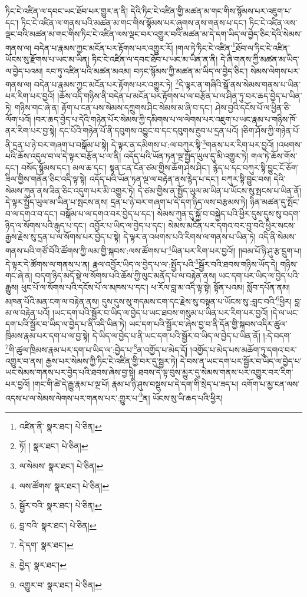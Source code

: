 ཏིང་ངེ་འཛིན་ལ་དབང་ཡང་ཐོབ་པར་གྱུར་ན་ནི། དེའི་ཏིང་ངེ་འཛིན་གྱི་མཚན་མ་གང་གིས་སྙོམས་པར་འཇུག་པ་དང་། ཏིང་ངེ་འཛིན་ལ་གནས་པའི་མཚན་མ་གང་གིས་སྙོམས་པར་ཞུགས་ནས་གནས་པ་དང་། ཏིང་ངེ་འཛིན་ལས་ལྡང་བའི་མཚན་མ་གང་གིས་ཏིང་ངེ་འཛིན་ལས་ལྡང་བར་འགྱུར་བའི་མཚན་མ་དེ་དག་ཡིད་ལ་བྱེད་ཅིང་དེའི་སེམས་གནས་ལ། བདེན་པ་རྣམས་ཀྱང་མངོན་པར་རྟོགས་པར་འགྱུར་རོ། །གལ་ཏེ་ཏིང་ངེ་འཛིན་\footnote{འཛིན་ནི་  སྣར་ཐང་།  པེ་ཅིན། }ཐོབ་ལ་ཏིང་ངེ་འཛིན་ཡོངས་སུ་རྫོགས་པ་ཡང་མ་ཡིན། ཏིང་ངེ་འཛིན་ལ་དབང་ཐོབ་པ་ཡང་མ་ཡིན་ན་ནི། དེ་ཞི་གནས་ཀྱི་མཚན་མ་ཡིད་ལ་བྱེད་པའམ། རབ་ཏུ་འཛིན་པའི་མཚན་མའམ། བཏང་སྙོམས་ཀྱི་མཚན་མ་ཡིད་ལ་བྱེད་ཅིང་། སེམས་ལེགས་པར་གནས་ལ། བདེན་པ་རྣམས་ཀྱང་མངོན་པར་རྟོགས་པར་འགྱུར་ཏེ། \footnote{ཏོ། །   སྣར་ཐང་།  པེ་ཅིན། }དེ་ལྟར་ན་གཞིའི་སྒོ་ནས་སེམས་གནས་པ་ཡིན་པར་རིག་པར་བྱའོ། །ཆོས་འདི་གཉིས་ནི་བདེན་པ་མངོན་པར་རྟོགས་པ་ལ་བརྩོན་པ་ལ་ཤིན་ཏུ་བར་ཆད་བྱེད་པ་ཡིན་ཏེ། གཉིས་གང་ཞེ་ན། རྟོག་པ་ངན་པས་སེམས་དཀྲུགས་ཤིང་སེམས་མ་ཞི་བ་དང་། ཤེས་བྱའི་དངོས་པོ་ལ་ཕྱིན་ཅི་ལོག་པའོ། །བར་ཆད་བྱེད་པ་དེའི་གཉེན་པོར་སེམས་ཀྱི་དམིགས་པ་ལ་ལེགས་པར་འཇུག་པ་ཡང་རྣམ་པ་གཉིས་ཁོ་ནར་རིག་པར་བྱ་སྟེ། དང་པོའི་གཉེན་པོ་ནི་དབུགས་འབྱུང་བ་དང་དབུགས་རྔུབ་པ་དྲན་པའོ། །ཅིག་ཤོས་ཀྱི་གཉེན་པོ་ནི་དྲན་པ་ཉེ་བར་གཞག་པ་བསྒོམ་པ་སྟེ། དེ་ལྟར་ན་དམིགས་པ་:ལ་བཀུར་སྟི་\footnote{ལ་སེམས་  སྣར་ཐང་།  པེ་ཅིན། }གནས་པར་རིག་པར་བྱའོ། །འཕགས་པའི་ཆོས་འདུལ་བ་ལ་དེ་ལྟར་བརྩོན་པ་ལ་ནི། འདོད་པའི་ཡོན་ཏན་ལྔ་སྤྱོད་ཡུལ་དུ་མི་འགྱུར་ཏེ། གལ་ཏེ་ཆོས་གོས་དང་། བསོད་སྙོམས་དང་། མལ་ཆ་དང་། སྟན་ངན་ངོན་ཙམ་གྱིས་ཆོག་ཤེས་ཤིང་། རྙེད་པ་དང་བཀུར་སྟི་བྱུང་ངོ་ཅོག་ཟིལ་གྱིས་གནོན་ཅིང་འདི་ལྟ་སྟེ། འདོད་པའི་ཡོན་ཏན་ལྔ་ལ་བརྟེན་ནས་རྙེད་པ་དང་། བཀུར་སྟི་བྱུང་བས། དེའི་སེམས་ཀུན་ནས་ཟིན་ཅིང་འདུག་པར་མི་འགྱུར་ཏེ། དེ་ཙམ་གྱིས་ན་སྤྱོད་ཡུལ་མ་ཡིན་པ་ཡོངས་སུ་སྤངས་པ་ཡིན་ནོ། དེ་ལྟར་སྤྱོད་ཡུལ་མ་ཡིན་པ་སྤངས་ནས། དྲན་པ་ཉེ་བར་གཞག་པ་དེ་དག་ཉིད་ལས་བརྩམས་ཏེ། ཉིན་མཚན་དུ་སྤོང་བ་ལ་དགའ་བ་དང་། བསྒོམ་པ་ལ་དགའ་བར་བྱེད་པ་དང་། སེམས་ཀུན་དུ་སྐྱོ་བ་བསྐྱེད་པའི་ཕྱིར་དུས་དུས་སུ་བདག་ཉིད་ལ་སོགས་པའི་རྒུད་པ་དང་། འབྱོར་པ་ཡིད་ལ་བྱེད་པ་དང་། སེམས་མངོན་པར་དགའ་བར་བྱ་བའི་ཕྱིར་སངས་རྒྱས་རྗེས་སུ་དྲན་པ་ལ་སོགས་པར་བྱེད་པ་སྟེ། དེ་ལྟར་ན་འཕགས་པའི་རིགས་ལ་གནས་པ་ཡིན་ཏེ། འདི་ནི་སེམས་གནས་པའི་གཙོ་བོའི་ཚོགས་ཀྱི་ལམ་གྱི་སྐབས་:ལས་ཚོགས་པ་\footnote{ལས་ཚོགས་  སྣར་ཐང་།  པེ་ཅིན། }ཡིན་པར་རིག་པར་བྱའོ།། །།བམ་པོ་ཉི་ཤུ་རྩ་དྲུག་པ། དེ་ལྟར་དེ་ཚོགས་ལ་གནས་པ་ན། རྣལ་འབྱོར་ཡིད་ལ་བྱེད་པ་ལ་:སྤྱོད་པའི་\footnote{སྦྱོར་བའི་  སྣར་ཐང་།  པེ་ཅིན། }སྦྱོར་བའི་ཐབས་གཉིས་ཡོད་དེ། གཉིས་གང་ཞེ་ན། བདག་ཉིད་མདོ་སྡེ་ལ་སོགས་པའི་ཆོས་ཀྱི་ལུང་མནོད་པ་ལ་བརྟེན་ནས། ཡང་དག་པར་ཡིད་ལ་བྱེད་པའི་རྒྱུས། ཕུང་པོ་ལ་སོགས་པའི་དངོས་པོ་ལ་མཁས་པ་དང་། ཕ་རོལ་བླ་མ་འདི་ལྟ་སྟེ། སྟོན་པའམ། སློབ་དཔོན་ནམ། མཁན་པོའི་མན་ངག་ལ་བརྟེན་ནས། དུས་དུས་སུ་གདམས་ངག་དང་རྗེས་སུ་བསྟན་པ་ཡོངས་སུ་:བླང་བའི་\footnote{བླ་བའི་  སྣར་ཐང་།  པེ་ཅིན། }ཕྱིར། བླ་མ་ལ་བརྟེན་པའོ། །ཡང་དག་པའི་སྦྱོར་བ་ཡིད་ལ་བྱེད་པ་ཡང་ཐབས་གསུམ་པ་ཡིན་པར་རིག་པར་བྱའོ། །དེ་ལ་ཡང་དག་པའི་སྦྱོར་བ་ཡིད་ལ་བྱེད་པ་ནི་འདི་ཡིན་ཏེ། ཡང་དག་པའི་སྦྱོར་བ་ཞེས་བྱ་བ་ནི་དོན་གྱི་སྐབས་འདིར་ཚུལ་ཁྲིམས་རྣམ་པར་དག་པ་ལ་བྱ་སྟེ། དེ་ཡིད་ལ་བྱེད་པ་ནི་ཡང་དག་པའི་སྦྱོར་བ་ཡིད་ལ་བྱེད་པ་ཡིན་ནོ། །:དེ་བདག་\footnote{དེ་དག་  སྣར་ཐང་། }གི་ཚུལ་ཁྲིམས་རྣམ་པར་དག་པ་ཡིད་ལ་:བྱེད་པ་\footnote{བྱེད་  སྣར་ཐང་། }ན་འགྱོད་པ་མེད་དོ། །འགྱོད་པ་མེད་པས་མཆོག་ཏུ་དགའ་བར་འགྱུར་བ་ནས། རྒྱས་པར་སེམས་ཀྱི་ཏིང་ངེ་འཛིན་གྱི་བར་དུ་སྦྱར་ཏེ། དེ་བས་ན་ཡང་དག་པར་སྦྱོར་བ་ཡིད་ལ་བྱེད་པ་ཡང་སེམས་གནས་པར་བྱེད་པའི་ཐབས་ཞེས་བྱ་སྟེ། ཐབས་དེ་ལྟ་བུས་མྱུར་དུ་སེམས་གནས་པར་འགྱུར་བར་རིག་པར་བྱའོ། །གང་གི་ཚེ་དེ་རྒྱུ་རྣམ་པ་ལྔ་པོ། རྣམ་པ་ཉི་ཤུས་བསྡུས་པ་དེ་དག་གི་སྲེད་པ་ཟད་པ། འགོག་པ་མྱ་ངན་ལས་འདས་པ་ལ་སེམས་ལེགས་པར་གནས་པར་:གྱུར་པ་\footnote{འགྱུར་བ་  སྣར་ཐང་།  པེ་ཅིན། }ན། ཡོངས་སུ་ཡི་ཆད་པའི་ཕྱིར། 